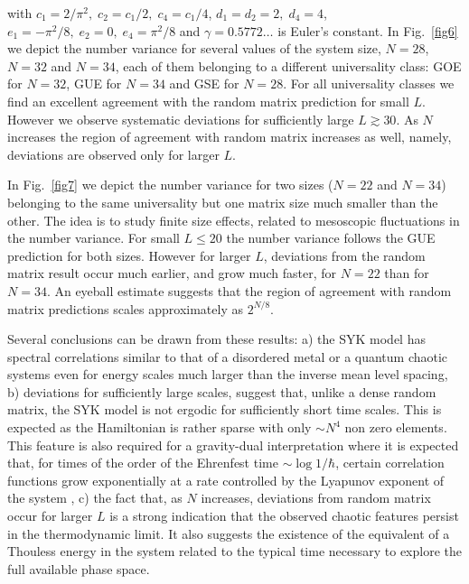 \documentclass[aps,showpacs,floatfix,superscriptaddress,pre,11pt]{revtex4-1}
\begin{document}
with $c_1={2}/{\pi^2},\;c_2=c_1/2,\; c_4 = c_1/4$,\; $d_1 = d_2 = 2,\; d_4 = 4$,\; $e_1 = -\pi^2/8,\; e_2 = 0,\; e_4 = \pi^2/8$ and $\gamma = 0.5772 \ldots$ is Euler's constant. 
In Fig.~\ref{fig6} we depict the number variance for several values of the system size, $N = 28$, $N=32$ and $N=34$, each of them belonging to a different universality class: GOE for $N = 32$, GUE for $N = 34$ and GSE for $N = 28$. For all universality classes we find an excellent agreement with the random matrix prediction for small $L$. However we observe systematic deviations for sufficiently large $L \gtrsim 30$. As $N$ increases the region of agreement with random matrix increases as well, namely, deviations are observed only for larger $L$.


In Fig.~\ref{fig7} we depict the number variance for two sizes ($N = 22$ and
$N=34$) belonging to the same universality but one matrix size much smaller than the other. The idea is to study finite size effects, related to mesoscopic fluctuations in the number variance.
For small $L \leq 20$ the number variance follows the GUE prediction for both sizes. However for larger $L$, deviations from the random matrix result occur much earlier, and grow much faster, for $N = 22$  than for $N = 34$. 
An eyeball estimate suggests that the region of agreement with random matrix predictions scales approximately as $2^{N/8}$. 

Several conclusions  can be drawn from these results: 
a) the SYK model has spectral correlations similar to that of a disordered metal or a quantum chaotic systems even for energy scales much larger than the inverse mean level spacing, b) deviations for sufficiently large scales, suggest that, unlike a dense random matrix, the SYK model is not ergodic for sufficiently short time scales. This is expected as the Hamiltonian is rather sparse with only $\sim N^4$ non zero elements. This feature is also required for a gravity-dual interpretation where it is expected that, for times of the order of the Ehrenfest time  $\sim \log 1/\hbar$, certain correlation functions grow exponentially at a rate controlled by the Lyapunov exponent of the system \cite{maldacena2015}, c) the fact that, as $N$ increases, deviations from random matrix occur for larger $L$ is a strong indication that the observed chaotic features persist in the thermodynamic limit. It also suggests the existence of the equivalent of a Thouless energy in the system related to the typical time necessary to explore the full available phase space. 
\end{document}
